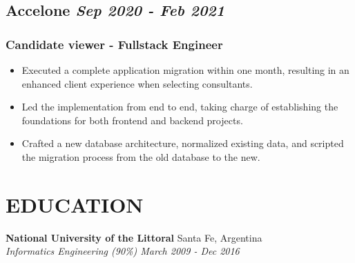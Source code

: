 \documentclass[12pt, letterpaper]{article}
\begin{document}
\subsection*{Accelone \hfill \small \textit{Sep 2020 - Feb 2021}}

\subsubsection*{Candidate viewer - Fullstack Engineer}
\begin{itemize}
    \setlength\itemsep{0em}
    \item Executed a complete application migration within one month, resulting in an enhanced client experience when selecting consultants.
    \item Led the implementation from end to end, taking charge of establishing the foundations for both frontend and backend projects.
    \item Crafted a new database architecture, normalized existing data, and scripted the migration process from the old database to the new.
\end{itemize}

\section{EDUCATION}

\textbf{National University of the Littoral} \hfill Santa Fe, Argentina \\
\textit{Informatics Engineering (90\%) \hfill March 2009 - Dec 2016} 
\end{document}
